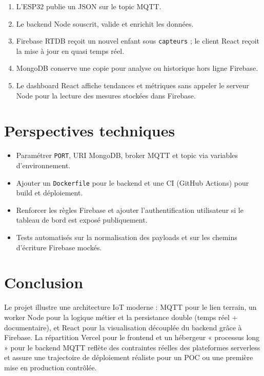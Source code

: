 \documentclass[11pt,a4paper]{article}
\begin{document}
\begin{enumerate}[leftmargin=*]
  \item L'ESP32 publie un JSON sur le topic MQTT.
  \item Le backend Node souscrit, valide et enrichit les données.
  \item Firebase RTDB reçoit un nouvel enfant sous \texttt{capteurs} ; le client React reçoit la mise à jour en quasi temps réel.
  \item MongoDB conserve une copie pour analyse ou historique hors ligne Firebase.
  \item Le dashboard React affiche tendances et métriques sans appeler le serveur Node pour la lecture des mesures stockées dans Firebase.
\end{enumerate}

\section{Perspectives techniques}

\begin{itemize}[leftmargin=*]
  \item Paramétrer \texttt{PORT}, URI MongoDB, broker MQTT et topic via variables d'environnement.
  \item Ajouter un \texttt{Dockerfile} pour le backend et une CI (GitHub Actions) pour build et déploiement.
  \item Renforcer les règles Firebase et ajouter l'authentification utilisateur si le tableau de bord est exposé publiquement.
  \item Tests automatisés sur la normalisation des payloads et sur les chemins d'écriture Firebase mockés.
\end{itemize}

\section{Conclusion}

Le projet illustre une architecture IoT moderne : MQTT pour le lien terrain, un worker Node pour la logique métier et la persistance double (temps réel + documentaire), et React pour la visualisation découplée du backend grâce à Firebase. La répartition Vercel pour le frontend et un hébergeur « processus long » pour le backend MQTT reflète des contraintes réelles des plateformes serverless et assure une trajectoire de déploiement réaliste pour un POC ou une première mise en production contrôlée.
\end{document}
